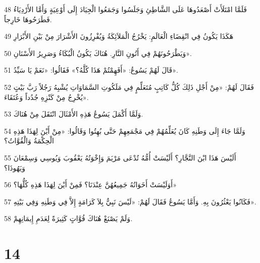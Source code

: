 \par 48 فَلَمَّا امْتَلَأَتْ أَصْعَدُوهَا عَلَى الشَّاطِئِ وَجَلَسُوا وَجَمَعُوا الْجِيَادَ إِلَى أَوْعِيَةٍ وَأَمَّا الأَرْدِيَاءُ فَطَرَحُوهَا خَارِجاً.
\par 49 هَكَذَا يَكُونُ فِي انْقِضَاءِ الْعَالَمِ: يَخْرُجُ الْمَلاَئِكَةُ وَيُفْرِزُونَ الأَشْرَارَ مِنْ بَيْنِ الأَبْرَارِ
\par 50 وَيَطْرَحُونَهُمْ فِي أَتُونِ النَّارِ. هُنَاكَ يَكُونُ الْبُكَاءُ وَصَرِيرُ الأَسْنَانِ».
\par 51 قَالَ لَهُمْ يَسُوعُ: «أَفَهِمْتُمْ هَذَا كُلَّهُ؟» فَقَالُوا: «نَعَمْ يَا سَيِّدُ».
\par 52 فَقَالَ لَهُمْ: «مِنْ أَجْلِ ذَلِكَ كُلُّ كَاتِبٍ مُتَعَلِّمٍ فِي مَلَكُوتِ السَّمَاوَاتِ يُشْبِهُ رَجُلاً رَبَّ بَيْتٍ يُخْرِجُ مِنْ كَنْزِهِ جُدُداً وَعُتَقَاءَ».
\par 53 وَلَمَّا أَكْمَلَ يَسُوعُ هَذِهِ الأَمْثَالَ انْتَقَلَ مِنْ هُنَاكَ.
\par 54 وَلَمَّا جَاءَ إِلَى وَطَنِهِ كَانَ يُعَلِّمُهُمْ فِي مَجْمَعِهِمْ حَتَّى بُهِتُوا وَقَالُوا: «مِنْ أَيْنَ لِهَذَا هَذِهِ الْحِكْمَةُ وَالْقُوَّاتُ؟
\par 55 أَلَيْسَ هَذَا ابْنَ النَّجَّارِ؟ أَلَيْسَتْ أُمُّهُ تُدْعَى مَرْيَمَ وَإِخْوَتُهُ يَعْقُوبَ وَيُوسِي وَسِمْعَانَ وَيَهُوذَا؟
\par 56 أَوَلَيْسَتْ أَخَوَاتُهُ جَمِيعُهُنَّ عِنْدَنَا؟ فَمِنْ أَيْنَ لِهَذَا هَذِهِ كُلُّهَا؟»
\par 57 فَكَانُوا يَعْثُرُونَ بِهِ. وَأَمَّا يَسُوعُ فَقَالَ لَهُمْ: «لَيْسَ نَبِيٌّ بِلاَ كَرَامَةٍ إِلاَّ فِي وَطَنِهِ وَفِي بَيْتِهِ».
\par 58 وَلَمْ يَصْنَعْ هُنَاكَ قُوَّاتٍ كَثِيرَةً لِعَدَمِ إِيمَانِهِمْ.

\chapter{14}


